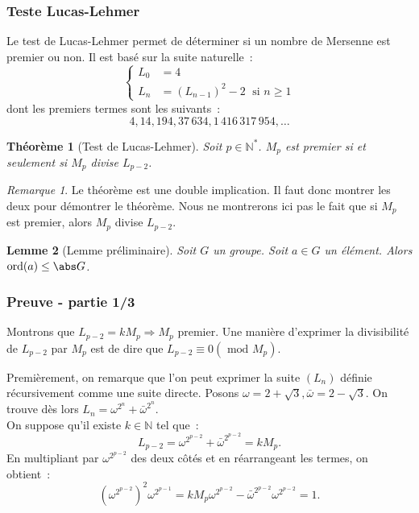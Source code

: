 \documentclass[10pt, mathserif]{beamer}
\DeclareMathOperator{\ord}{ord}
\newcommand{\N}{\mathbb N}
\renewcommand{\mod}{\mbox{ mod }}
\newtheorem{thm}{Théorème}[section]
\newtheorem{lem}[thm]{Lemme}
\theoremstyle{definition}
\theoremstyle{remark}
\newtheorem*{rmq}{Remarque}
\begin{document}
	\begin{frame}
		\frametitle{Teste Lucas-Lehmer}
		Le test de Lucas-Lehmer permet de déterminer si un nombre de Mersenne est premier ou non. Il est basé sur la suite naturelle~:
		\[\begin{cases}
			L_0 &= 4 \\
			L_n &= (L_{n-1})^2 - 2 \;\text{ si } n \geq 1
		\end{cases}\]
		dont les premiers termes sont les suivants~:
		\[4, 14, 194, 37\,634, 1\,416\,317\,954, \ldots\]
	\end{frame}

	\begin{frame}
		\begin{thm}[Test de Lucas-Lehmer]
			Soit $p \in \N^*$. $M_p$ est premier si et seulement si $M_p$ divise $L_{p-2}$.
		\end{thm}

		\begin{rmq}
			Le théorème est une double implication. Il faut donc montrer les deux pour démontrer le théorème. Nous ne montrerons ici pas le fait que si $M_p$
			est premier, alors $M_p$ divise $L_{p-2}$.
		\end{rmq}

		\begin{lem}[Lemme préliminaire]
			Soit $G$ un groupe. Soit $a \in G$ un élément. Alors $\ord(a) \leq \abs G$.
		\end{lem}
	\end{frame}

	\begin{frame}
		\frametitle{Preuve - partie 1/3}
		Montrons que $L_{p-2} = kM_p \Rightarrow M_p$ premier. Une manière d'exprimer la divisibilité de $L_{p-2}$ par $M_p$ est de dire que
		$L_{p-2} \equiv 0 (\mod M_p)$.

		Premièrement, on remarque que l'on peut exprimer la suite $(L_n)$ définie récursivement comme une suite directe. Posons
		$\omega = 2 + \sqrt 3, \bar \omega = 2 - \sqrt 3$. On trouve dès lors $L_n = \omega^{2^n} + \bar \omega^{2^n}$. \\

		On suppose qu'il existe $k \in \N$ tel que~:
		\[L_{p-2} = \omega^{2^{p-2}} + \bar \omega^{2^{p-2}} = kM_p.\]
		En multipliant par $\omega^{2^{p-2}}$ des deux côtés et en réarrangeant les termes, on obtient~:
		\[\left(\omega^{2^{p-2}}\right)^2 \omega^{2^{p-1}} = kM_p\omega^{2^{p-2}} - \bar \omega^{2^{p-2}}\omega^{2^{p-2}} = 1.\]
	\end{frame}
\end{document}
